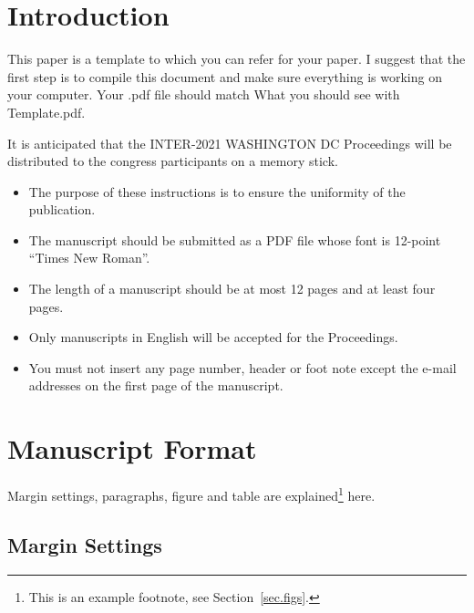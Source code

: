 \section{Introduction}

\noindent
This paper is a template to which you can refer for your paper.  I suggest that the first step is to compile this document and make sure everything is working on your computer.  Your .pdf file should match What you should see with Template.pdf. 

It is anticipated that the INTER-2021 WASHINGTON DC Proceedings will be distributed to the congress participants on a memory stick. 

\begin{itemize}[itemsep=5pt]
\item The purpose of these instructions is to ensure the uniformity of the publication. 
\item The manuscript should be submitted as a PDF file whose font is 12-point ``Times New Roman''.
\item The length of a manuscript should be at most 12 pages and at least four pages. 
\item Only manuscripts in English will be accepted for the Proceedings. 
\item You must not insert any page number, header or foot note except the e-mail addresses on the first page of the manuscript.
\end{itemize}

\clearpage
\section{Manuscript Format}

\noindent
Margin settings, paragraphs, figure and table are explained\footnote{This is an example footnote, see Section~\ref{sec.figs}.}  here. 

\subsection{Margin Settings}

